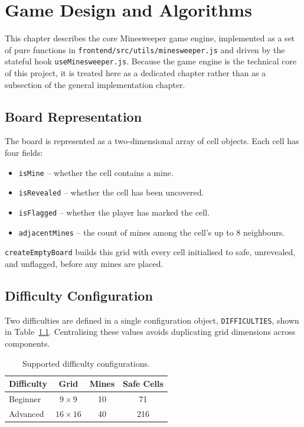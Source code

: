 \chapter{Game Design and Algorithms}
\label{ch:game-design}

This chapter describes the core Minesweeper game engine, implemented as a
set of pure functions in \texttt{frontend/src/utils/minesweeper.js} and
driven by the stateful hook \texttt{useMinesweeper.js}. Because the game
engine is the technical core of this project, it is treated here as a
dedicated chapter rather than as a subsection of the general implementation
chapter.

\section{Board Representation}
The board is represented as a two-dimensional array of cell objects. Each
cell has four fields:
\begin{itemize}[nosep]
    \item \texttt{isMine} -- whether the cell contains a mine.
    \item \texttt{isRevealed} -- whether the cell has been uncovered.
    \item \texttt{isFlagged} -- whether the player has marked the cell.
    \item \texttt{adjacentMines} -- the count of mines among the cell's up
    to 8 neighbours.
\end{itemize}
\texttt{createEmptyBoard} builds this grid with every cell initialised to
safe, unrevealed, and unflagged, before any mines are placed.

\section{Difficulty Configuration}
Two difficulties are defined in a single configuration object,
\texttt{DIFFICULTIES}, shown in Table~\ref{tab:difficulties}. Centralising
these values avoids duplicating grid dimensions across components.

\begin{table}[h]
\centering
\caption{Supported difficulty configurations.}
\label{tab:difficulties}
\begin{tabular}{@{}lccc@{}}
\toprule
\textbf{Difficulty} & \textbf{Grid} & \textbf{Mines} & \textbf{Safe Cells} \\
\midrule
Beginner & $9 \times 9$   & 10 & 71 \\
Advanced & $16 \times 16$ & 40 & 216 \\
\bottomrule
\end{tabular}
\end{table}


